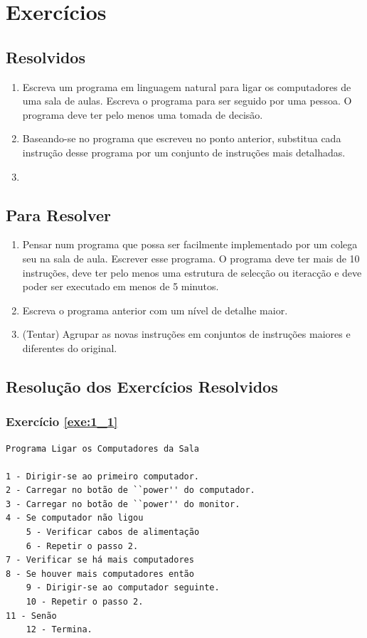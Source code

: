 \section{Exercícios}

\subsection{Resolvidos}

\begin{enumerate}
	\item \label{exe:1_1} Escreva um programa em linguagem natural para ligar os computadores de uma sala de aulas. Escreva o programa para ser seguido por uma pessoa. O programa deve ter pelo menos uma tomada de decisão.
	
	\item \label{exe:1_2} Baseando-se no programa que escreveu no ponto anterior, substitua cada instrução desse programa por um conjunto de instruções mais detalhadas.
	
	\item \label{exe:1_3} 
\end{enumerate}

\subsection{Para Resolver}
\begin{enumerate}
\item 
Pensar num programa que possa ser facilmente implementado por um colega seu na sala de aula. Escrever esse programa.  O programa deve ter mais de 10 instruções, deve ter pelo menos uma estrutura de selecção ou iteracção e deve poder ser executado em menos de 5 minutos.

\item Escreva o programa anterior com um nível de detalhe maior.

\item (Tentar) Agrupar as novas instruções em conjuntos de instruções maiores e diferentes do original.
\end{enumerate}

\subsection{Resolução dos Exercícios Resolvidos}

{\footnotesize
\subsubsection*{Exercício \ref{exe:1_1}}
\begin{verbatim}
Programa Ligar os Computadores da Sala

1 - Dirigir-se ao primeiro computador.
2 - Carregar no botão de ``power'' do computador.
3 - Carregar no botão de ``power'' do monitor.
4 - Se computador não ligou
    5 - Verificar cabos de alimentação
    6 - Repetir o passo 2.
7 - Verificar se há mais computadores     
8 - Se houver mais computadores então
    9 - Dirigir-se ao computador seguinte.
    10 - Repetir o passo 2.
11 - Senão
    12 - Termina.    
\end{verbatim}}
